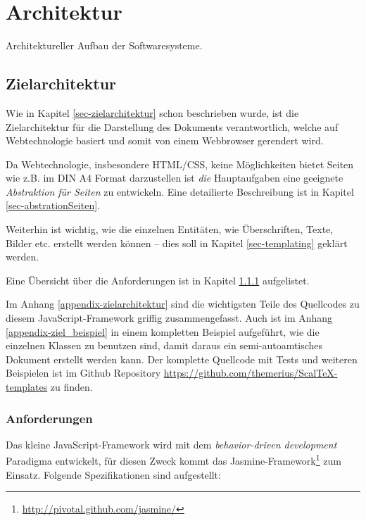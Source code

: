\chapter{Architektur}\label{ch-architektur}

Architektureller Aufbau der Softwaresysteme.

\section{Zielarchitektur}

Wie in Kapitel \ref{sec-zielarchitektur} schon beschrieben wurde, ist die
Zielarchitektur für die Darstellung des Dokuments verantwortlich, welche
auf Webtechnologie basiert und somit von einem Webbrowser gerendert wird.

Da Webtechnologie, insbesondere HTML/CSS, keine Möglichkeiten bietet
Seiten wie z.B. im DIN A4 Format darzustellen ist \emph{die}
Hauptaufgaben eine geeignete \emph{Abstraktion für Seiten} zu entwickeln.
Eine detailierte Beschreibung ist in Kapitel \ref{sec-abstrationSeiten}.

Weiterhin ist wichtig, wie die einzelnen Entitäten, wie Überschriften,
Texte, Bilder etc. erstellt werden können -- dies soll in Kapitel
\ref{sec-templating} geklärt werden.

Eine Übersicht über die Anforderungen ist in Kapitel
\ref{sec-ziel_anforderungen} aufgelistet.

Im Anhang \ref{appendix-zielarchitektur} sind die wichtigsten Teile des
Quellcodes zu diesem JavaScript-Framework griffig zusammengefasst.
Auch ist im Anhang \ref{appendix-ziel_beispiel} in einem kompletten
Beispiel aufgeführt, wie die einzelnen Klassen zu benutzen sind,
damit daraus ein semi-autoamtisches Dokument erstellt werden kann.
Der komplette Quellcode mit Tests und weiteren Beispielen ist im
Github Repository \url{https://github.com/themerius/ScalTeX-templates}
zu finden.

\subsection{Anforderungen}\label{sec-ziel_anforderungen}

Das kleine JavaScript-Framework wird mit dem
\emph{behavior-driven development} Paradigma entwickelt,
für diesen Zweck kommt das
Jasmine-Framework\footnote{\url{http://pivotal.github.com/jasmine/}}
zum Einsatz. Folgende Spezifikationen sind aufgestellt:

